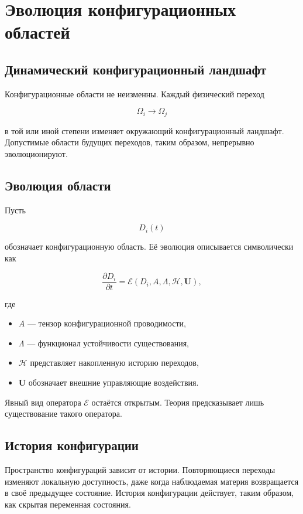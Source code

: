 \chapter{Эволюция конфигурационных областей}

\section{Динамический конфигурационный ландшафт}

Конфигурационные области не неизменны. Каждый физический переход

\[ \Omega_i \rightarrow \Omega_j \]

в той или иной степени изменяет окружающий конфигурационный ландшафт. Допустимые области будущих переходов, таким образом, непрерывно эволюционируют.

\section{Эволюция области}

Пусть

\[ D_i(t) \]

обозначает конфигурационную область. Её эволюция описывается символически как

\[ \boxed{ \frac{\partial D_i}{\partial t} = \mathcal{E} \left( D_i, A, \Lambda, \mathcal H, \mathbf U \right), } \]

где

\begin{itemize}
\item $A$ — тензор конфигурационной проводимости,
\item $\Lambda$ — функционал устойчивости существования,
\item $\mathcal H$ представляет накопленную историю переходов,
\item $\mathbf U$ обозначает внешние управляющие воздействия.
\end{itemize}

Явный вид оператора $\mathcal E$ остаётся открытым. Теория предсказывает лишь существование такого оператора.

\section{История конфигурации}

Пространство конфигураций зависит от истории. Повторяющиеся переходы изменяют локальную доступность, даже когда наблюдаемая материя возвращается в своё предыдущее состояние. История конфигурации действует, таким образом, как скрытая переменная состояния.

